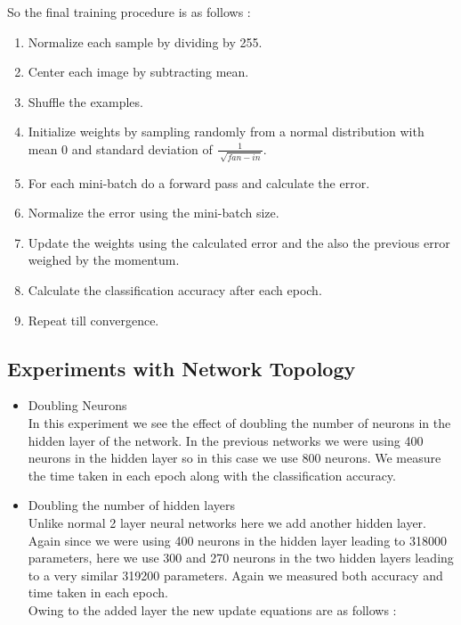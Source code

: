 \documentclass[11pt,twoside]{article}
\begin{document}
So the final training procedure is as follows :

\begin{enumerate}
\item Normalize each sample by dividing by 255.
\item Center each image by subtracting mean.
\item Shuffle the examples.
\item Initialize weights by sampling randomly from a normal distribution with mean 0 and standard deviation of $\frac{1}{\sqrt[]{fan-in}}$.
\item For each mini-batch do a forward pass and calculate the error.
\item Normalize the error using the mini-batch size.
\item Update the weights using the calculated error and the also the previous error weighed by the momentum.
\item Calculate the classification accuracy after each epoch.
\item Repeat till convergence.
\end{enumerate}

\subsection{Experiments with Network Topology}
\begin{itemize}
\item{Doubling Neurons}\\
In this experiment we see the effect of doubling the number of neurons in the hidden layer of the network. In the previous networks we were using 400 neurons in the hidden layer so in this case we use 800 neurons. We measure the time taken in each epoch along with the classification accuracy.\\

\item{Doubling the number of hidden layers}\\
Unlike normal  2 layer neural networks here we add another hidden layer. Again since we were using 400 neurons in the hidden layer leading to 318000 parameters, here we use 300 and 270 neurons in the two hidden layers leading to a very similar 319200 parameters. Again we measured both accuracy and time taken in each epoch.\\

Owing to the added layer the new update equations are as follows :

\end{itemize}
\end{document}
